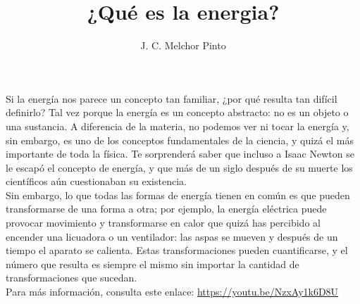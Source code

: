 \documentclass[12pt]{guia}
\title{¿Qué es la energia?}
\author{J. C. Melchor Pinto}
\begin{document}
\pagestyle{headandfoot}
\addpoints
\INFO
\begin{opening}
    {Si la energía nos parece un concepto tan familiar, ¿por qué resulta tan
        difícil definirlo? Tal vez porque la energía es un concepto abstracto: no
        es un objeto o una sustancia. A diferencia de la materia, no podemos
        ver ni tocar la energía y, sin embargo, es uno de los conceptos fundamentales
        de la ciencia, y quizá el más importante de toda la física. Te sorprenderá saber que incluso a Isaac Newton se le escapó
        el concepto de energía, y que más de un siglo después de su muerte los
        científicos aún cuestionaban su existencia.\\[1em]
        Sin embargo, lo que todas las formas de energía tienen en común es
        que pueden transformarse de una forma a otra; por ejemplo, la energía
        eléctrica puede provocar movimiento y transformarse en calor que quizá
        has percibido al encender una licuadora o un ventilador: las aspas se mueven y después de un tiempo el aparato se calienta. Estas transformaciones
        pueden cuantificarse, y el número que resulta es siempre el mismo sin importar la cantidad de transformaciones que sucedan.
        \\[1em]
        Para más información, consulta este enlace: \href{https://youtu.be/NzxAy1k6D8U}{https://youtu.be/NzxAy1k6D8U}
    }
\end{opening}
\begin{questions}
    
    \newpage
    
\end{questions}

\end{document}
